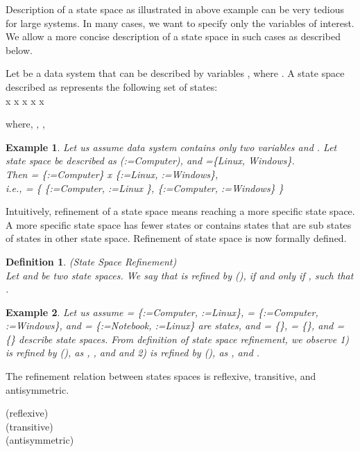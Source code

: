 \documentclass[12pt,journal,letterpaper,onecolumn]{IEEEtran}
\newtheorem{definition}{Definition}[section]
\newtheorem{example}{Example}[section]
\begin{document}
Description of a state space as illustrated
in above example can be very tedious for large systems. In many cases,
we want to specify only the variables of interest. We allow a more concise
description of a state space in such cases as described below.

Let  be a data system that can be described by variables
, where  .
A state space   described as  represents the following set of states:\\
 x  x  x
 x
    x
 
 where,  ,  ,
 

\begin{example}
Let us assume data system  contains only two variables  and .
Let state space  be described as (:={\ttfamily Computer}), and
 =\{{\ttfamily Linux, Windows}\}. \\
 Then  = \{:={\ttfamily Computer}\} x \{:={\ttfamily Linux}, :={\ttfamily Windows}\}, \\
 i.e.,  = \{ \{:={\ttfamily Computer}, :={\ttfamily Linux} \},
                     \{:={\ttfamily Computer}, :={\ttfamily Windows}\}
                   \}
\label{eg:statespace2}
\end{example}


Intuitively, refinement of a state space means reaching a more
specific state space. A more specific state space has fewer states or
contains states that are sub states of states in other state space.
Refinement of state space is now formally defined.

\begin{definition}(State Space Refinement)\\
Let  and  be two state spaces. We say that 
is refined by  (), if and only
if ,  
such that .
\label{def:statespacerefinement}
\end{definition}


\begin{example}
Let us assume  = \{:={\ttfamily Computer}, :={\ttfamily Linux}\},
      = \{:={\ttfamily Computer}, :={\ttfamily Windows}\}, and
      = \{:={\ttfamily Notebook}, :={\ttfamily Linux}\} are states, and  = \{\},
      = \{\}, and
      = \{\} describe state spaces.
From definition of state space refinement, we observe
1)  is refined by  (), as , , and  and 2)  is refined by  (), as ,  and .
\label{eg:statespaceref}
\end{example}



The refinement relation between states spaces is reflexive,
transitive, and antisymmetric.
\begin{center}
\begin{minipage}{4.5in}
  (reflexive) \\
   (transitive)\\
   (antisymmetric)
\end{minipage}
\end{center}
\end{document}
